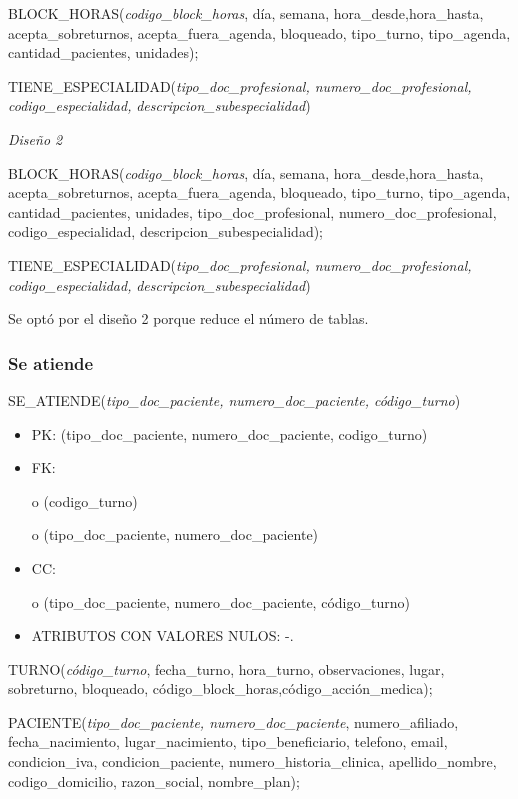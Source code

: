 \documentclass[a4paper,11pt]{article}
\begin{document}
BLOCK\_HORAS(\emph{codigo\_block\_horas}, día, semana, hora\_desde,hora\_hasta, 
acepta\_sobreturnos, acepta\_fuera\_agenda, bloqueado, tipo\_turno, tipo\_agenda, 
cantidad\_pacientes, unidades);

TIENE\_ESPECIALIDAD(\emph{tipo\_doc\_profesional, numero\_doc\_profesional, codigo\_especialidad,} 
\emph{descripcion\_subespecialidad})

\textit{Diseño 2}

BLOCK\_HORAS(\emph{codigo\_block\_horas}, día, semana, hora\_desde,hora\_hasta, 
acepta\_sobreturnos, acepta\_fuera\_agenda, bloqueado, tipo\_turno, tipo\_agenda, 
cantidad\_pacientes, unidades,\emph{ }tipo\_doc\_profesional, numero\_doc\_profesional, 
codigo\_especialidad, descripcion\_subespecialidad);

TIENE\_ESPECIALIDAD(\emph{tipo\_doc\_profesional, numero\_doc\_profesional, codigo\_especialidad,} 
\emph{descripcion\_subespecialidad})

Se optó por el diseño 2 porque reduce el número de tablas.\label{HToc293405853}

\subsubsection{\textbf{Se atiende}}

SE\_ATIENDE(\emph{tipo\_doc\_paciente, numero\_doc\_paciente, código\_turno})

\begin{itemize}
\item PK: (tipo\_doc\_paciente, numero\_doc\_paciente, codigo\_turno)

\item FK: 

o (codigo\_turno)

o (tipo\_doc\_paciente, numero\_doc\_paciente)

\item CC:

o (tipo\_doc\_paciente, numero\_doc\_paciente, código\_turno)

\item ATRIBUTOS CON VALORES NULOS:  -.
\end{itemize}

TURNO(\emph{código\_turno}, fecha\_turno, hora\_turno, observaciones, lugar, sobreturno, 
bloqueado, código\_block\_horas,código\_acción\_medica);

PACIENTE(\emph{tipo\_doc\_paciente, numero\_doc\_paciente}, numero\_afiliado, fecha\_nacimiento, 
lugar\_nacimiento, tipo\_beneficiario, telefono, email, condicion\_iva, condicion\_paciente, 
numero\_historia\_clinica, apellido\_nombre, codigo\_domicilio, razon\_social, 
 nombre\_plan);\label{HToc293405854}
\end{document}
